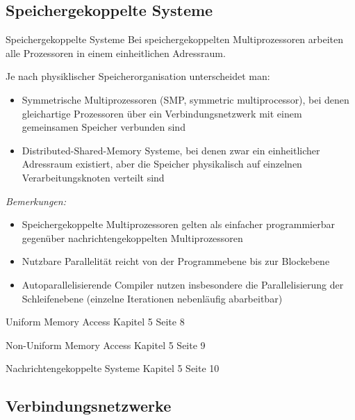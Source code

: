 \subsection{Speichergekoppelte Systeme}

\begin{defi}{Speichergekoppelte Systeme}
    Bei speichergekoppelten Multiprozessoren arbeiten alle Prozessoren in einem einheitlichen Adressraum.
    
    Je nach physiklischer Speicherorganisation unterscheidet man:
    \begin{itemize}
        \item Symmetrische Multiprozessoren (SMP, symmetric multiprocessor), 
        bei denen gleichartige Prozessoren über ein Verbindungsnetzwerk mit einem gemeinsamen Speicher verbunden sind
        \item Distributed-Shared-Memory Systeme, 
        bei denen zwar ein einheitlicher Adressraum existiert, 
        aber die Speicher physikalisch auf einzelnen Verarbeitungsknoten verteilt sind
    \end{itemize}

    \emph{Bemerkungen:}
    \begin{itemize}
        \item Speichergekoppelte Multiprozessoren gelten als einfacher programmierbar gegenüber nachrichtengekoppelten Multiprozessoren
        \item Nutzbare Parallelität reicht von der Programmebene bis zur Blockebene
        \item Autoparallelisierende Compiler nutzen insbesondere die Parallelisierung der Schleifenebene (einzelne Iterationen nebenläufig abarbeitbar)
    \end{itemize}
\end{defi}

\begin{defi}{Uniform Memory Access}
    Kapitel 5 Seite 8
\end{defi}

\begin{defi}{Non-Uniform Memory Access}
    Kapitel 5 Seite 9
\end{defi}

\begin{defi}{Nachrichtengekoppelte Systeme}
    Kapitel 5 Seite 10
\end{defi}

\subsection{Verbindungsnetzwerke}

